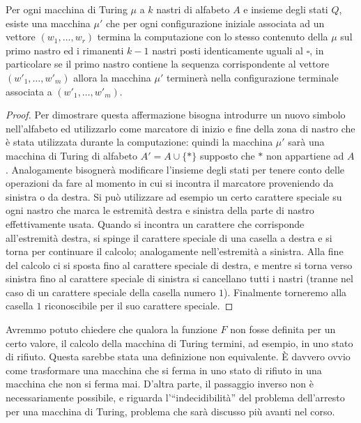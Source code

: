 \begin{lemm}
    \label{lem: pulizia nastri}
Per ogni macchina di Turing $\mu$ a $k$ nastri di alfabeto $A$ e insieme degli stati $Q$, esiste una macchina $\mu'$ che per ogni configurazione iniziale associata ad un vettore $(w_1,\dots,w_r)$ termina la computazione con lo stesso contenuto della $\mu$ sul primo nastro ed i rimanenti $k-1$ nastri posti identicamente uguali al $\square$, in particolare se il primo nastro contiene la sequenza corrispondente al vettore $(w'_1,\dots,w'_m)$ allora la macchina $\mu'$ terminerà nella configurazione terminale associata a $(w'_1,\dots,w'_m)$.
\end{lemm}

\begin{proof}
Per dimostrare questa affermazione bisogna introdurre un nuovo simbolo nell'alfabeto ed utilizzarlo come marcatore di inizio e fine della zona di nastro che è stata utilizzata durante la computazione: quindi la macchina $\mu'$ sarà una macchina di Turing di alfabeto $A'=A\cup\{*\}$ supposto che $*$ non appartiene ad $A$. Analogamente bisognerà modificare l'insieme degli stati per tenere conto delle operazioni da fare al momento in cui si incontra il marcatore proveniendo da sinistra o da destra.
Si può utilizzare ad esempio un certo carattere speciale su ogni nastro che marca le estremità destra e sinistra della parte di nastro effettivamente usata. Quando si incontra un carattere che corrisponde all'estremità destra, si spinge il carattere speciale di una casella a destra e si torna per continuare il calcolo; analogamente nell'estremità a sinistra. Alla fine del calcolo ci si sposta fino al carattere speciale di destra, e mentre si torna verso sinistra fino al carattere speciale di sinistra si cancellano tutti i nastri (tranne nel caso di un carattere speciale della casella numero $1$). Finalmente torneremo alla casella $1$ riconoscibile per il suo carattere speciale.
\end{proof}

Avremmo potuto chiedere che qualora la funzione $F$ non fosse definita per un certo valore, il calcolo della macchina di Turing termini, ad esempio, in uno stato di rifiuto. Questa sarebbe stata una definizione non equivalente. È davvero ovvio come trasformare una macchina che si ferma in uno stato di rifiuto in una macchina che non si ferma mai. D'altra parte, il passaggio inverso non è necessariamente possibile, e riguarda l'``indecidibilità'' del problema dell'arresto per una macchina di Turing, problema che sarà discusso più avanti nel corso.

